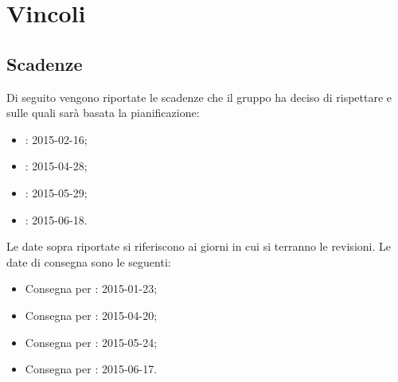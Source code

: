 \section{Vincoli}\label{organizzazione}
\subsection{Scadenze}\label{scadenze}
Di seguito vengono riportate le scadenze che il gruppo \gruppo ha deciso di rispettare e sulle quali sarà basata la pianificazione:
\begin{itemize}
\item \RR: 2015-02-16;
\item \RP: 2015-04-28;
\item \RQ: 2015-05-29;
\item \RA: 2015-06-18.
\end{itemize}
Le date sopra riportate si riferiscono ai giorni in cui si terranno le revisioni. Le date di consegna sono le seguenti:
\begin{itemize}
\item Consegna per \RR: 2015-01-23;
\item Consegna per \RP: 2015-04-20;
\item Consegna per \RQ: 2015-05-24;
\item Consegna per \RA: 2015-06-17.
\end{itemize}
